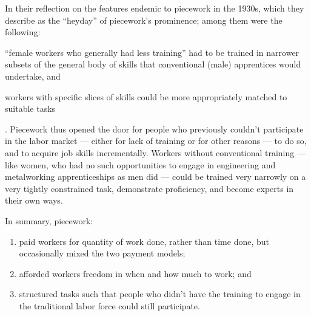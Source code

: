 \documentclass[trackingWork]{subfiles}
\begin{document}
In their reflection on the features endemic to piecework in the 1930s,
which they describe as the ``heyday'' of piecework's prominence;
among them were the following:
\begin{inlinelist}
\item ``female workers who generally had less training'' had to be trained in narrower subsets of the general body of skills that conventional (male) apprentices would undertake, and
\item workers with specific slices of skills could be more appropriately matched to suitable tasks
\end{inlinelist}
\cite{hart2013rise}.
Piecework thus opened the door for people who previously couldn't participate in the labor market
--- either for lack of training or for other reasons ---
to do so, and to acquire job skills incrementally.
Workers without conventional training
--- like women, who had no such opportunities to engage in engineering and metalworking apprenticeships as men did ---
could be trained very narrowly on a very tightly constrained task,
demonstrate proficiency, and become experts in their own ways.

In summary, piecework:
\begin{enumerate}
  \item paid workers for quantity of work done, rather than time done, but occasionally mixed the two payment models;
  \item afforded workers freedom in when and how much to work; and
  \item structured tasks such that people who didn't have the training to engage in the traditional labor force could still participate.
\end{enumerate}



\end{document}

